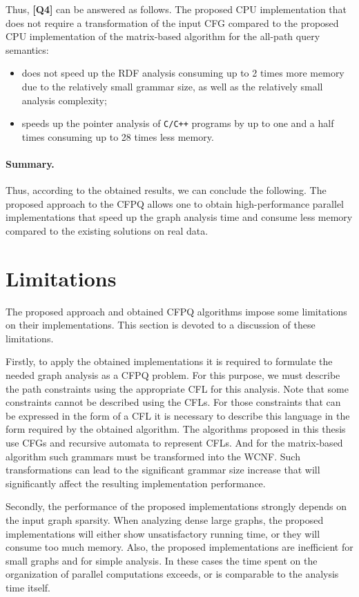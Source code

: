 Thus, \textbf{[Q4]} can be answered as follows. The proposed CPU implementation that does not require a transformation of the input CFG compared to the proposed CPU implementation of the matrix-based algorithm for the all-path query semantics:
\begin{itemize}
    \item does not speed up the RDF analysis consuming up to 2 times more memory due to the relatively small grammar size, as well as the relatively small analysis complexity;
    \item speeds up the pointer analysis of \texttt{C/C++} programs by up to one and a half times consuming up to 28 times less memory.
\end{itemize}

\paragraph{Summary.} Thus, according to the obtained results, we can conclude the following. The proposed approach to the CFPQ allows one to obtain high-performance parallel implementations that speed up the graph analysis time and consume less memory compared to the existing solutions on real data.

\section{Limitations}\label{sec:ch5/sect3}
The proposed approach and obtained CFPQ algorithms impose some limitations on their implementations. This section is devoted to a discussion of these limitations.

Firstly, to apply the obtained implementations it is required to formulate the needed graph analysis as a CFPQ problem. For this purpose, we must describe the path constraints using the appropriate CFL for this analysis. Note that some constraints cannot be described using the CFLs. For those constraints that can be expressed in the form of a CFL it is necessary to describe this language in the form required by the obtained algorithm. The algorithms proposed in this thesis use CFGs and recursive automata to represent CFLs. And for the matrix-based algorithm such grammars must be transformed into the WCNF. Such transformations can lead to the significant grammar size increase that will significantly affect the resulting implementation performance.

Secondly, the performance of the proposed implementations strongly depends on the input graph sparsity. When analyzing dense large graphs, the proposed implementations will either show unsatisfactory running time, or they will consume too much memory. Also, the proposed implementations are inefficient for small graphs and for simple analysis. In these cases the time spent on the organization of parallel computations exceeds, or is comparable to the analysis time itself.

